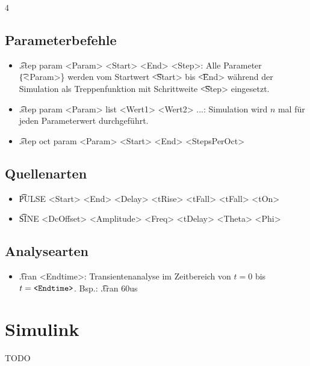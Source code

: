 \documentclass[fs, footer]{latex4ei}
\begin{document}
\begin{multicols*}{4}
        \subsection{Parameterbefehle}
        \begin{itemize}
        \item \t{.step param <Param> <Start> <End> <Step>}: Alle Parameter \t{\{<Param>\}} werden vom Startwert \t{<Start>} bis \t{<End>} während der Simulation als Treppenfunktion mit Schrittweite \t{<Step>} eingesetzt.
        \item \t{.step param <Param> list <Wert1> <Wert2> ...}: Simulation wird $n$ mal für jeden Parameterwert durchgeführt.
        \item \t{.step oct param <Param> <Start> <End> <StepsPerOct>}
        \end{itemize}
        \subsection{Quellenarten}
        \begin{itemize}
            \item \t{PULSE <Start> <End> <Delay> <tRise> <tFall> <tFall> <tOn>}
            \item \t{SINE <DcOffset> <Amplitude> <Freq> <tDelay> <Theta> <Phi>}
        \end{itemize}
        \subsection{Analysearten}
        \begin{itemize}
        \item \t{.tran <Endtime>}: Transientenanalyse im Zeitbereich von $t = 0$ bis $t = \text{\texttt{<Endtime>}}$. Bsp.: \t{.tran 60us}
    \end{itemize}

    \section{Simulink}
    TODO %





\end{multicols*}

\label{LastPage}

\end{document}
